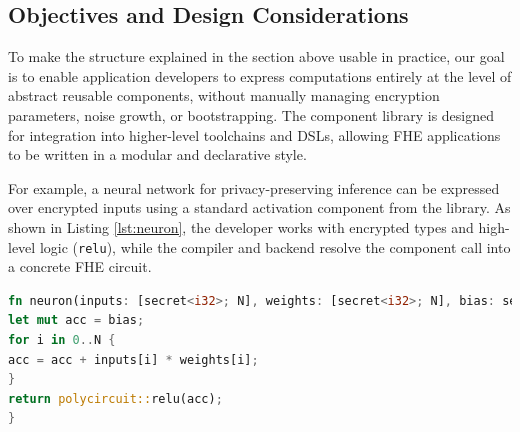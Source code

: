 \documentclass[article]{iacrtrans}
\newcommand{\andreea}[1]{{\color{blue} [Andreea: #1]}}
\newcommand{\valentina}[1]{{\color{orange} [Valentina: #1]}}
\begin{document}

\subsection{Objectives and Design Considerations}
To make the structure explained in the section above usable in practice, our goal is to enable application developers to express computations entirely at the level of abstract reusable components, without manually managing encryption parameters, noise growth, or bootstrapping. The component library is designed for integration into higher-level toolchains and DSLs, allowing FHE applications to be written in a modular and declarative style.

For example, a  neural network for privacy-preserving inference can be expressed over encrypted inputs using a standard activation component from the library. As shown in Listing \ref{lst:neuron}, the developer works with encrypted types and high-level logic (\verb|relu|), while the compiler and backend resolve the component call into a concrete FHE circuit.

\vspace{0.5em}
\begin{lstlisting}[language=Rust, caption={Encrypted neuron with ReLU activation}, label={lst:neuron}]
fn neuron(inputs: [secret<i32>; N], weights: [secret<i32>; N], bias: secret<i32>) -> secret<i32> {
let mut acc = bias;
for i in 0..N {
acc = acc + inputs[i] * weights[i];
}
return polycircuit::relu(acc);
}
\end{lstlisting}
\vspace{0.5em}
\end{document}
